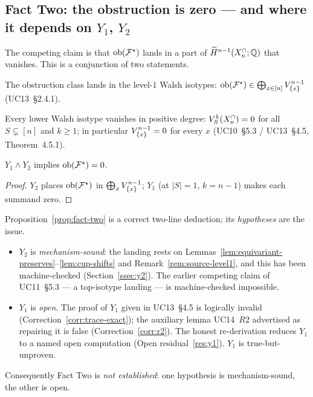\subsection{Fact Two: the obstruction is zero --- and where it depends on $Y_1$, $Y_2$}
\label{ssec:fact-two}

The competing claim is that $\mathrm{ob}(\mathcal{F}^{\star})$ lands in a part of
$\widetilde H^{n-1}(X^{\cap}_n;\mathbb{Q})$ that vanishes. This is a conjunction of
two statements.

\begin{definition}
\label{def:y1-y2}
\leavevmode
\begin{description}[leftmargin=2.6em,style=nextline]
\item[$Y_2$ (landing).] The obstruction class lands in the level-$1$
  Walsh isotypes: $\mathrm{ob}(\mathcal{F}^{\star})\in\bigoplus_{x\in[n]}V_{\{x\}}^{n-1}$
  (UC13~\S2.4.1).
\item[$Y_1$ (lower-Walsh vanishing).] Every lower Walsh isotype
  vanishes in positive degree: $V_{S}^{k}(X^{\cap}_n)=0$ for all
  $S\subsetneq[n]$ and $k\ge1$; in particular
  $V_{\{x\}}^{n-1}=0$ for every $x$ (UC10~\S5.3 / UC13~\S4.5,
  Theorem~4.5.1).
\end{description}
\end{definition}

\begin{proposition}
\label{prop:fact-two}
$Y_1\wedge Y_2$ implies $\mathrm{ob}(\mathcal{F}^{\star})=0$.
\end{proposition}

\begin{proof}
$Y_2$ places $\mathrm{ob}(\mathcal{F}^{\star})$ in $\bigoplus_xV_{\{x\}}^{n-1}$; $Y_1$
(at $|S|=1$, $k=n-1$) makes each summand zero.
\end{proof}

\begin{status}
Proposition~\ref{prop:fact-two} is a correct two-line deduction; its
\emph{hypotheses} are the issue.
\begin{itemize}[leftmargin=1.4em]
\item $Y_2$ is \emph{mechanism-sound}: the landing rests on
  Lemmas~\ref{lem:equivariant-preserves}--\ref{lem:cup-shifts} and
  Remark~\ref{rem:source-level1}, and this has been machine-checked
  (Section~\ref{ssec:y2}). The earlier competing claim of UC11~\S5.3
  --- a top-isotype landing --- is machine-checked impossible.
\item $Y_1$ is \emph{open}. The proof of $Y_1$ given in UC13~\S4.5 is
  logically invalid (Correction~\ref{corr:trace-exact}); the auxiliary
  lemma UC14~$R2$ advertised as repairing it is false
  (Correction~\ref{corr:r2}). The honest re-derivation reduces $Y_1$ to
  a named open computation (Open residual~\ref{res:y1}). $Y_1$ is
  true-but-unproven.
\end{itemize}
Consequently Fact Two is \emph{not established}: one hypothesis is
mechanism-sound, the other is open.
\end{status}

